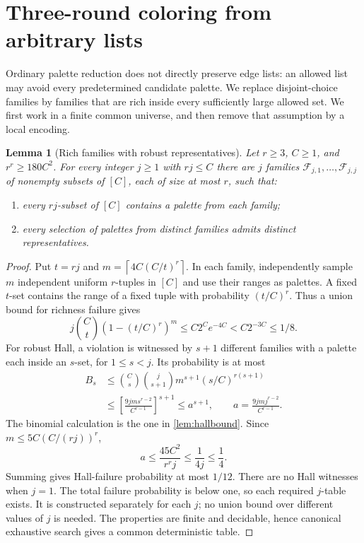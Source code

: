 \documentclass[11pt]{article}
\newtheorem{lemma}[theorem]{Lemma}
\theoremstyle{definition}
\theoremstyle{remark}
\newcommand{\F}{\mathcal F}
\newcommand{\ceil}[1]{\left\lceil #1\right\rceil}
\begin{document}
\section{Three-round coloring from arbitrary lists}\label{sec:lists}

Ordinary palette reduction does not directly preserve edge lists:
an allowed list may avoid every predetermined candidate palette.
We replace disjoint-choice families by families that are rich inside
every sufficiently large allowed set. We first work in a finite common
universe, and then remove that assumption by a local encoding.

\begin{lemma}[Rich families with robust representatives]\label{lem:rich}
Let $r\ge3$, $C\ge1$, and $r^r\ge180C^2$. For every integer $j\ge1$
with $rj\le C$ there are $j$ families
$\F_{j,1},\ldots,\F_{j,j}$ of nonempty subsets of $[C]$, each of
size at most $r$, such that:
\begin{enumerate}
\item every $rj$-subset of $[C]$ contains a palette from each family;
\item every selection of palettes from distinct families admits distinct
representatives.
\end{enumerate}
\end{lemma}
\begin{proof}
Put $t=rj$ and $m=\ceil{4C(C/t)^r}$. In each family, independently
sample $m$ independent uniform $r$-tuples in $[C]$ and use their ranges
as palettes. A fixed $t$-set contains the range of a fixed tuple with
probability $(t/C)^r$. Thus a union bound for richness failure gives
\[
 j\binom Ct(1-(t/C)^r)^m
 \le C2^C e^{-4C}<C2^{-3C}\le1/8.
\]
For robust Hall, a violation is witnessed by $s+1$ different families
with a palette each inside an $s$-set, for $1\le s<j$. Its probability
is at most
\begin{align*}
 B_s&\le\binom Cs\binom j{s+1}m^{s+1}(s/C)^{r(s+1)}\\
 &\le\left[\frac{9jm s^{r-2}}{C^{r-1}}\right]^{s+1}
 \le a^{s+1},\qquad a=\frac{9jm j^{r-2}}{C^{r-1}}.
\end{align*}
The binomial calculation is the one in \cref{lem:hallbound}.
Since $m\le5C(C/(rj))^r$,
\[
 a\le\frac{45C^2}{r^rj}\le\frac1{4j}\le\frac14.
\]
Summing gives Hall-failure probability at most $1/12$. There are no
Hall witnesses when $j=1$. The total failure probability is below one,
so each required $j$-table exists. It is constructed separately for each
$j$; no union bound over different values of $j$ is needed. The
properties are finite and decidable, hence canonical exhaustive search
gives a common deterministic table.
\end{proof}
\end{document}
